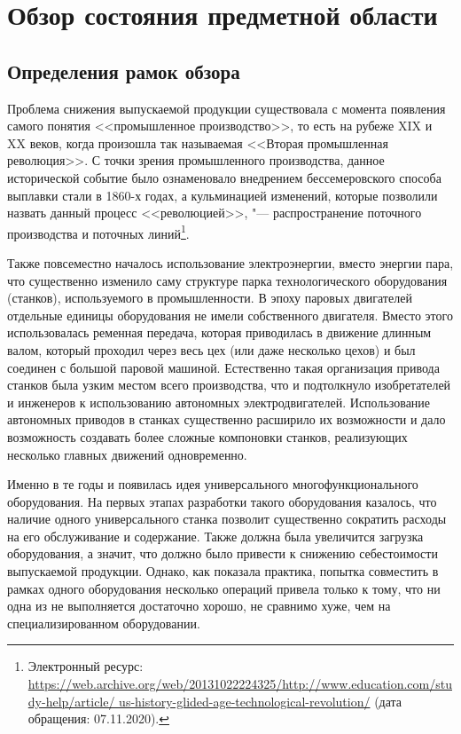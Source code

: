 \chapter{Обзор состояния предметной области}\label{ch:ch1}

\section{Определения рамок обзора}\label{sec:ch1/sec1}

Проблема снижения выпускаемой продукции существовала с момента появления самого понятия <<промышленное производство>>, то есть на рубеже XIX и XX веков, когда произошла так называемая <<Вторая промышленная революция>>. С точки зрения промышленного производства, данное исторической событие было ознаменовало внедрением бессемеровского способа выплавки стали в 1860-х годах, а кульминацией изменений, которые позволили назвать данный процесс <<революцией>>, "--- распространение поточного производства и поточных линий\footnote{Электронный ресурс: {\tiny\url{https://web.archive.org/web/20131022224325/http://www.education.com/study-help/article/ us-history-glided-age-technological-revolution/}} (дата обращения: 07.11.2020).}.

Также повсеместно началось использование электроэнергии, вместо энергии пара, что существенно изменило саму структуре парка технологического оборудования (станков), используемого в промышленности. В эпоху паровых двигателей отдельные единицы оборудования не имели собственного двигателя. Вместо этого использовалась ременная передача, которая приводилась в движение длинным валом, который проходил через весь цех (или даже несколько цехов) и был соединен с большой паровой машиной. Естественно такая организация привода станков была узким местом всего производства, что и подтолкнуло изобретателей и инженеров к использованию автономных электродвигателей. Использование автономных приводов в станках существенно расширило их возможности и дало возможность создавать более сложные компоновки станков, реализующих несколько главных движений одновременно. 

Именно в те годы и появилась идея универсального многофункционального оборудования. На первых этапах разработки такого оборудования казалось, что наличие одного универсального станка позволит существенно сократить расходы на его обслуживание и содержание. Также должна была увеличится загрузка оборудования, а значит, что должно было привести к снижению себестоимости выпускаемой продукции. Однако, как показала практика, попытка совместить в рамках одного оборудования несколько операций привела только к тому, что ни одна из не выполняется достаточно хорошо, не сравнимо хуже, чем на специализированном оборудовании. 

